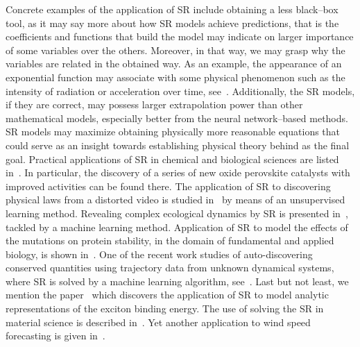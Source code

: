 \documentclass[a4paper,12pt]{elsarticle}
\begin{document}
	Concrete examples of the application of SR include obtaining a less black--box tool, as it may say more about how SR models achieve predictions, that is the coefficients and functions that build the model may indicate on larger importance of some variables over the others. Moreover, in that way, we may grasp why the variables are related in the obtained way. As an example, the appearance of an exponential function may associate with some physical phenomenon such as the intensity of radiation or acceleration over time, see~\cite{udrescu2020ai}. Additionally, the SR models, if they are correct, may possess larger extrapolation power than other mathematical models, especially better from the neural network--based methods. SR models may maximize obtaining physically more reasonable equations that could serve as an insight towards establishing physical theory behind as the final goal.  Practical applications of SR in chemical and biological sciences are listed in~\cite{weng2020simple}. In particular,  the discovery of a series of new oxide perovskite catalysts with improved activities can be found there. The application of SR to discovering physical laws from a distorted video is studied in~\cite{udrescu2021symbolic} by means of an unsupervised learning method. Revealing complex ecological dynamics by SR is presented in~\cite{chen2019revealing}, tackled by a machine learning method. Application of SR to model the effects of the mutations on protein stability, in the domain of fundamental and applied biology,  is shown in~\cite{louis2021reviewing}. One of the recent work studies of auto-discovering conserved quantities using trajectory data from unknown dynamical systems, where SR is solved by a machine learning algorithm, see~\cite{liu2021machine}. Last but not least, we mention the paper~\cite{liang2019phillips} which discovers the application of SR to model analytic representations of the exciton binding energy. The use of solving the SR in material science is described in~\cite{wang2019symbolic,wang2022symbolic,burlacu2022symbolic,kabliman2021application}. Yet another application to wind speed forecasting is given in~\cite{abdellaoui2021symbolic}. 
	
\end{document}

